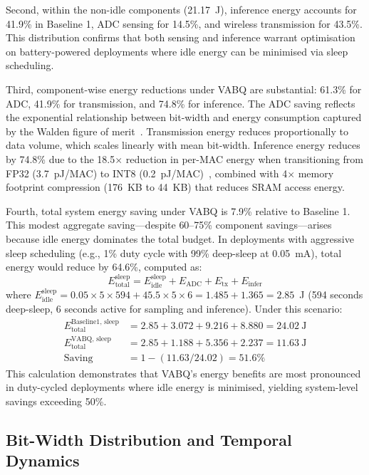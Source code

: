 Second, within the non-idle components (21.17~J), inference energy accounts for 41.9\% in Baseline 1, ADC sensing for 14.5\%, and wireless transmission for 43.5\%. This distribution confirms that both sensing and inference warrant optimisation on battery-powered deployments where idle energy can be minimised via sleep scheduling.

Third, component-wise energy reductions under VABQ are substantial: 61.3\% for ADC, 41.9\% for transmission, and 74.8\% for inference. The ADC saving reflects the exponential relationship between bit-width and energy consumption captured by the Walden figure of merit~\cite{waldenADC2018,andrulis2024adc}. Transmission energy reduces proportionally to data volume, which scales linearly with mean bit-width. Inference energy reduces by 74.8\% due to the 18.5$\times$ reduction in per-MAC energy when transitioning from FP32 (3.7~pJ/MAC) to INT8 (0.2~pJ/MAC)~\cite{guo2020fixedpoint}, combined with 4$\times$ memory footprint compression (176~KB to 44~KB) that reduces SRAM access energy.

Fourth, total system energy saving under VABQ is 7.9\% relative to Baseline 1. This modest aggregate saving---despite 60--75\% component savings---arises because idle energy dominates the total budget. In deployments with aggressive sleep scheduling (e.g., 1\% duty cycle with 99\% deep-sleep at 0.05~mA), total energy would reduce by 64.6\%, computed as:
\[
E_{\text{total}}^{\text{sleep}} = E_{\text{idle}}^{\text{sleep}} + E_{\text{ADC}} + E_{\text{tx}} + E_{\text{infer}}
\]
where \(E_{\text{idle}}^{\text{sleep}} = 0.05 \times 5 \times 594 + 45.5 \times 5 \times 6 = 1.485 + 1.365 = 2.85\)~J (594 seconds deep-sleep, 6 seconds active for sampling and inference). Under this scenario:
\begin{align*}
E_{\text{total}}^{\text{Baseline1, sleep}} &= 2.85 + 3.072 + 9.216 + 8.880 = 24.02~\text{J} \\
E_{\text{total}}^{\text{VABQ, sleep}} &= 2.85 + 1.188 + 5.356 + 2.237 = 11.63~\text{J} \\
\text{Saving} &= 1 - (11.63 / 24.02) = 51.6\%
\end{align*}
This calculation demonstrates that VABQ's energy benefits are most pronounced in duty-cycled deployments where idle energy is minimised, yielding system-level savings exceeding 50\%.

\subsection{Bit-Width Distribution and Temporal Dynamics}
\label{sec:res_bitwidth}

